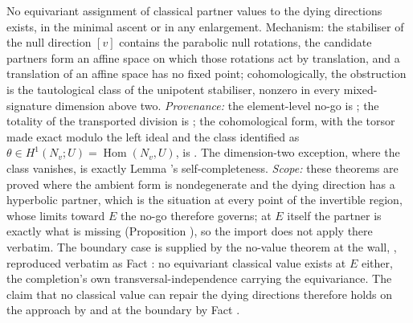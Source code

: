 No equivariant assignment of classical partner values to the dying directions exists, in the minimal ascent or in any enlargement. Mechanism: the stabiliser of the null direction $[v]$ contains the parabolic null rotations, the candidate partners form an affine space on which those rotations act by translation, and a translation of an affine space has no fixed point; cohomologically, the obstruction is the tautological class of the unipotent stabiliser, nonzero in every mixed-signature dimension above two. \emph{Provenance:} the element-level no-go is \cite[Thm.~4.2]{ButlerT1}; the totality of the transported division is \cite[Thm.~4.10]{ButlerT1}; the cohomological form, with the torsor made exact modulo the left ideal and the class identified as $\theta \in H^1(N_v; U) = \operatorname{Hom}(N_v, U)$, is \cite[Thm.~4.8]{ButlerT1}. The dimension-two exception, where the class vanishes, is exactly Lemma 's self-completeness. \emph{Scope:} these theorems are proved where the ambient form is nondegenerate and the dying direction has a hyperbolic partner, which is the situation at every point of the invertible region, whose limits toward $E$ the no-go therefore governs; at $E$ itself the partner is exactly what is missing (Proposition ), so the import does not apply there verbatim. The boundary case is supplied by the no-value theorem at the wall, \cite[Thm.~10.4]{ButlerT4}, reproduced verbatim as Fact : no equivariant classical value exists at $E$ either, the completion's own transversal-independence carrying the equivariance. The claim that no classical value can repair the dying directions therefore holds on the approach by \cite[Thm.~4.2]{ButlerT1} and at the boundary by Fact .
